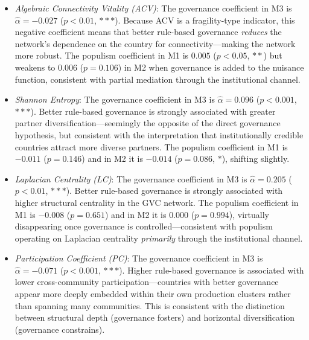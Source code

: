 \documentclass[12pt]{article}
\begin{document}
\begin{itemize}
  \item \textit{Algebraic Connectivity Vitality (ACV)}: The governance coefficient in M3 is $\hat{\alpha} = -0.027$ ($p < 0.01$, $***$). Because ACV is a fragility-type indicator, this negative coefficient means that better rule-based governance \textit{reduces} the network's dependence on the country for connectivity---making the network more robust. The populism coefficient in M1 is $0.005$ ($p < 0.05$, $**$) but weakens to $0.006$ ($p = 0.106$) in M2 when governance is added to the nuisance function, consistent with partial mediation through the institutional channel.

  \item \textit{Shannon Entropy}: The governance coefficient in M3 is $\hat{\alpha} = 0.096$ ($p < 0.001$, $***$). Better rule-based governance is strongly associated with greater partner diversification---seemingly the opposite of the direct governance hypothesis, but consistent with the interpretation that institutionally credible countries attract more diverse partners. The populism coefficient in M1 is $-0.011$ ($p = 0.146$) and in M2 it is $-0.014$ ($p = 0.086$, $*$), shifting slightly.

  \item \textit{Laplacian Centrality (LC)}: The governance coefficient in M3 is $\hat{\alpha} = 0.205$ ($p < 0.01$, $***$). Better rule-based governance is strongly associated with higher structural centrality in the GVC network. The populism coefficient in M1 is $-0.008$ ($p = 0.651$) and in M2 it is $0.000$ ($p = 0.994$), virtually disappearing once governance is controlled---consistent with populism operating on Laplacian centrality \textit{primarily} through the institutional channel.

  \item \textit{Participation Coefficient (PC)}: The governance coefficient in M3 is $\hat{\alpha} = -0.071$ ($p < 0.001$, $***$). Higher rule-based governance is associated with lower cross-community participation---countries with better governance appear more deeply embedded within their own production clusters rather than spanning many communities. This is consistent with the distinction between structural depth (governance fosters) and horizontal diversification (governance constrains).
\end{itemize}
\end{document}
